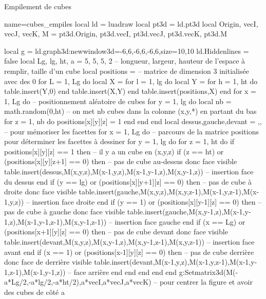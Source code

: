 \begin{demo}{Empilement de cubes}
\begin{luadraw}{name=cubes_empiles}
local ld = luadraw
local pt3d = ld.pt3d
local Origin, vecI, vecJ, vecK, M = pt3d.Origin, pt3d.vecI, pt3d.vecJ, pt3d.vecK, pt3d.M

local g = ld.graph3d:new{window3d={-6,6,-6,6,-6,6},size={10,10}}
ld.Hiddenlines = false
local Lg, lg, ht, a = 5, 5, 5, 2 -- longueur, largeur, hauteur de l'espace à remplir, taille d'un cube
local positions = {} -- matrice de dimension 3 initialisée avec des 0
for L = 1, Lg do
    local X = {}
    for l = 1, lg do
        local Y = {}
        for h = 1, ht do table.insert(Y,0) end
        table.insert(X,Y)
    end
    table.insert(positions,X)
end
for x = 1, Lg do  -- positionnement aléatoire de cubes
    for y = 1, lg do
        local nb = math.random(0,ht) -- on met nb cubes dans la colonne (x,y,*) en partant du bas
        for z = 1, nb do positions[x][y][z] = 1 end
    end
end
local dessus,gauche,devant = {},{},{} -- pour mémoriser les facettes
for x = 1, Lg do -- parcours de la matrice positions pour déterminer les facettes à dessiner
    for y = 1, lg do
        for z = 1, ht do
            if positions[x][y][z] == 1 then -- il y a un cube en (x,y,z)
                if (z == ht) or (positions[x][y][z+1] == 0) then -- pas de cube au-dessus donc face visible
                    table.insert(dessus,{M(x,y,z),M(x-1,y,z),M(x-1,y-1,z),M(x,y-1,z)}) -- insertion face du dessus
                end
                if (y == lg) or (positions[x][y+1][z] == 0) then -- pas de cube à droite donc face  visible
                    table.insert(gauche,{M(x,y,z),M(x,y,z-1),M(x-1,y,z-1),M(x-1,y,z)}) -- insertion face droite
                end
                if (y == 1) or (positions[x][y-1][z] == 0) then -- pas de cube à gauche donc face visible
                    table.insert(gauche,{M(x,y-1,z),M(x-1,y-1,z),M(x-1,y-1,z-1),M(x,y-1,z-1)}) -- insertion face gauche
                end                    
                if (x == Lg) or (positions[x+1][y][z] == 0) then -- pas de cube devant donc face visible
                    table.insert(devant,{M(x,y,z),M(x,y-1,z),M(x,y-1,z-1),M(x,y,z-1)}) -- insertion face avant
                end
                if (x == 1) or (positions[x-1][y][z] == 0) then -- pas de cube derrière donc face de derrière visible
                    table.insert(devant,{M(x-1,y,z),M(x-1,y,z-1),M(x-1,y-1,z-1),M(x-1,y-1,z)}) -- face arrière
                end
            end
        end
    end
end
g:Setmatrix3d({M(-a*Lg/2,-a*lg/2,-a*ht/2),a*vecI,a*vecJ,a*vecK}) -- pour centrer la figure et avoir des cubes de côté a

\end{luadraw}
\end{demo}
